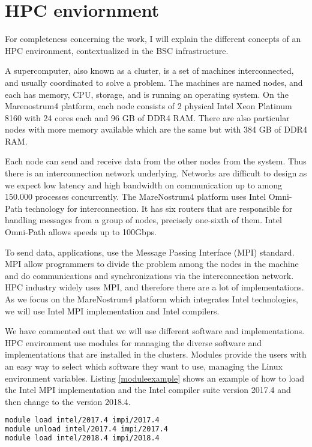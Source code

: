 \section{HPC enviornment}

For completeness concerning the work, I will explain the different concepts of an HPC environment, contextualized in the BSC infrastructure.

A supercomputer, also known as a cluster, is a set of machines interconnected, and usually coordinated to solve a problem. The machines are named nodes, and each has memory, CPU, storage, and is running an operating system.  On the Marenostrum4 platform, each node consists of 2 physical Intel Xeon Platinum 8160 with 24 cores each and 96 GB of DDR4 RAM. There are also particular nodes with more memory available which are the same but with 384 GB of DDR4 RAM.
 
Each node can send and receive data from the other nodes from the system. Thus there is an interconnection network underlying. Networks are difficult to design as we expect low latency and high bandwidth on communication up to among 150.000 processes concurrently. The MareNostrum4 platform uses Intel Omni-Path technology for interconnection. It has six routers that are responsible for handling messages from a group of nodes, precisely one-sixth of them. Intel Omni-Path allows speeds up to 100Gbps.

To send data, applications, use the Message Passing Interface (MPI) standard. MPI allow programmers to divide the problem among the nodes in the machine and do communications and synchronizations via the interconnection network. HPC industry widely uses MPI, and therefore there are a lot of implementations. As we focus on the MareNostrum4 platform which integrates Intel technologies, we will use Intel MPI implementation and Intel compilers.

We have commented out that we will use different software and implementations.  HPC environment use modules for managing the diverse software and implementations that are installed in the clusters. Modules provide the users with an easy way to select which software they want to use, managing the Linux environment variables. Listing \ref{moduleexample} shows an example of how to load the Intel MPI implementation and the Intel compiler suite version 2017.4 and then change to the version 2018.4.

\begin{lstlisting}[language=sh, caption={Example of module usage.}, label={moduleexample}]
module load intel/2017.4 impi/2017.4
module unload intel/2017.4 impi/2017.4
module load intel/2018.4 impi/2018.4
\end{lstlisting}

